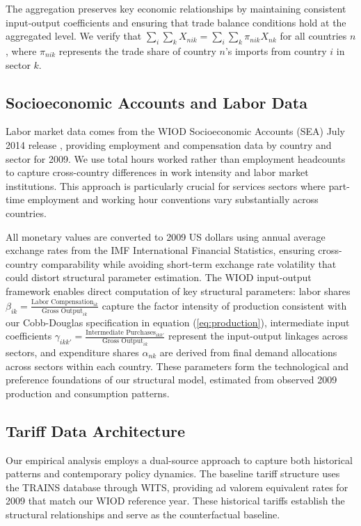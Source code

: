 The aggregation preserves key economic relationships by maintaining consistent input-output coefficients and ensuring that trade balance conditions hold at the aggregated level. We verify that $\sum_{i} \sum_{k} X_{nik} = \sum_{i} \sum_{k} \pi_{nik} X_{nk}$ for all countries $n$, where $\pi_{nik}$ represents the trade share of country $n$'s imports from country $i$ in sector $k$.

\subsection{Socioeconomic Accounts and Labor Data}

Labor market data comes from the WIOD Socioeconomic Accounts (SEA) July 2014 release \citep{timmer2015illustrated}, providing employment and compensation data by country and sector for 2009. We use total hours worked rather than employment headcounts to capture cross-country differences in work intensity and labor market institutions. This approach is particularly crucial for services sectors where part-time employment and working hour conventions vary substantially across countries.

All monetary values are converted to 2009 US dollars using annual average exchange rates from the IMF International Financial Statistics, ensuring cross-country comparability while avoiding short-term exchange rate volatility that could distort structural parameter estimation. The WIOD input-output framework enables direct computation of key structural parameters: labor shares $\beta_{ik} = \frac{\text{Labor Compensation}_{ik}}{\text{Gross Output}_{ik}}$ capture the factor intensity of production consistent with our Cobb-Douglas specification in equation (\ref{eq:production}), intermediate input coefficients $\gamma_{ikk'} = \frac{\text{Intermediate Purchases}_{ikk'}}{\text{Gross Output}_{ik}}$ represent the input-output linkages across sectors, and expenditure shares $\alpha_{nk}$ are derived from final demand allocations across sectors within each country. These parameters form the technological and preference foundations of our structural model, estimated from observed 2009 production and consumption patterns.

\subsection{Tariff Data Architecture}

Our empirical analysis employs a dual-source approach to capture both historical patterns and contemporary policy dynamics. The baseline tariff structure uses the TRAINS database through WITS, providing ad valorem equivalent rates for 2009 that match our WIOD reference year. These historical tariffs establish the structural relationships and serve as the counterfactual baseline.

